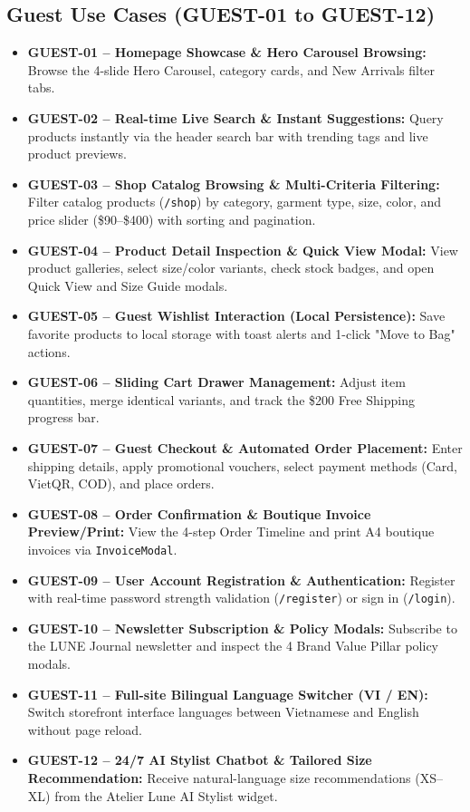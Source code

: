 \documentclass[12pt,a4paper,oneside]{report}
\begin{document}
\subsection{Guest Use Cases (GUEST-01 to GUEST-12)}
\begin{itemize}[leftmargin=1.2cm]
    \item \textbf{GUEST-01 -- Homepage Showcase \& Hero Carousel Browsing:} Browse the 4-slide Hero Carousel, category cards, and New Arrivals filter tabs.
    \item \textbf{GUEST-02 -- Real-time Live Search \& Instant Suggestions:} Query products instantly via the header search bar with trending tags and live product previews.
    \item \textbf{GUEST-03 -- Shop Catalog Browsing \& Multi-Criteria Filtering:} Filter catalog products (\texttt{/shop}) by category, garment type, size, color, and price slider (\$90--\$400) with sorting and pagination.
    \item \textbf{GUEST-04 -- Product Detail Inspection \& Quick View Modal:} View product galleries, select size/color variants, check stock badges, and open Quick View and Size Guide modals.
    \item \textbf{GUEST-05 -- Guest Wishlist Interaction (Local Persistence):} Save favorite products to local storage with toast alerts and 1-click "Move to Bag" actions.
    \item \textbf{GUEST-06 -- Sliding Cart Drawer Management:} Adjust item quantities, merge identical variants, and track the \$200 Free Shipping progress bar.
    \item \textbf{GUEST-07 -- Guest Checkout \& Automated Order Placement:} Enter shipping details, apply promotional vouchers, select payment methods (Card, VietQR, COD), and place orders.
    \item \textbf{GUEST-08 -- Order Confirmation \& Boutique Invoice Preview/Print:} View the 4-step Order Timeline and print A4 boutique invoices via \texttt{InvoiceModal}.
    \item \textbf{GUEST-09 -- User Account Registration \& Authentication:} Register with real-time password strength validation (\texttt{/register}) or sign in (\texttt{/login}).
    \item \textbf{GUEST-10 -- Newsletter Subscription \& Policy Modals:} Subscribe to the LUNE Journal newsletter and inspect the 4 Brand Value Pillar policy modals.
    \item \textbf{GUEST-11 -- Full-site Bilingual Language Switcher (VI / EN):} Switch storefront interface languages between Vietnamese and English without page reload.
    \item \textbf{GUEST-12 -- 24/7 AI Stylist Chatbot \& Tailored Size Recommendation:} Receive natural-language size recommendations (XS--XL) from the Atelier Lune AI Stylist widget.
\end{itemize}
\end{document}
